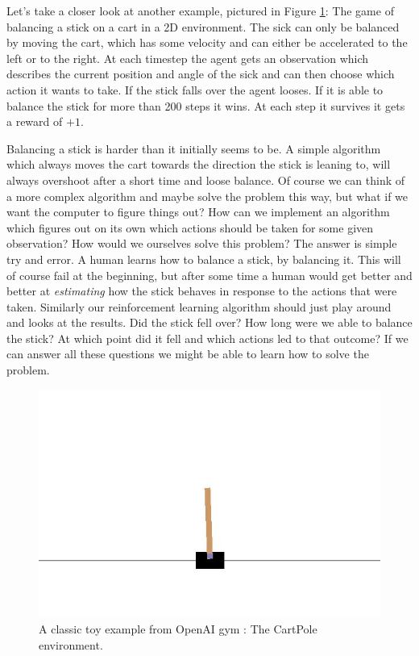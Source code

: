 
Let's take a closer look at another example, pictured in Figure \ref{fig:CartPole}: The game of balancing a stick on a cart in a 2D environment. The sick can only be balanced by moving the cart, which has some velocity and can either be accelerated to the left or to the right. At each timestep the agent gets an observation which describes the current position and angle of the sick and can then choose which action it wants to take. If the stick falls over the agent looses. If it is able to balance the stick for more than 200 steps it wins. At each step it survives it gets a reward of $+1$.

Balancing a stick is harder than it initially seems to be. A simple algorithm which always moves the cart towards the direction the stick is leaning to, will always overshoot after a short time and loose balance. Of course we can think of a more complex algorithm and maybe solve the problem this way, but what if we want the computer to figure things out? How can we implement an algorithm which figures out on its own which actions should be taken for some given observation? How would we ourselves solve this problem? The answer is simple try and error. A human learns how to balance a stick, by balancing it. This will of course fail at the beginning, but after some time a human would get better and better at \textit{estimating} how the stick behaves in response to the actions that were taken. Similarly our reinforcement learning algorithm should just play around and looks at the results. Did the stick fell over? How long were we able to balance the stick? At which point did it fell and which actions led to that outcome? If we can answer all these questions we might be able to learn how to solve the problem.

\begin{figure}[ht]
  
  \begin{center}
      \includegraphics[trim=0px 50px 0px 100px, clip, width=0.6\columnwidth]{figures/rl/CartPole.jpg}
  \end{center}
  
  \caption[CartPole Environment]{A classic toy example from OpenAI gym \cite{openAIgym}: The CartPole environment.}
  \label{fig:CartPole}
\end{figure}


